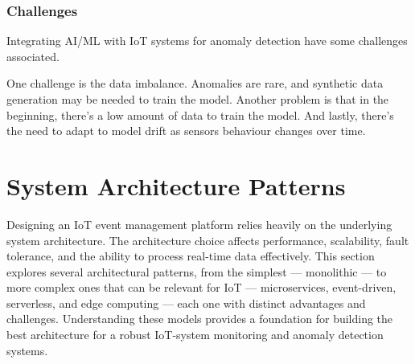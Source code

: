 \subsubsection{Challenges}

Integrating \gls{AI}/\gls{ML} with \gls{IoT} systems for anomaly detection
have some challenges associated.

One challenge is the data imbalance.
Anomalies are rare, and synthetic data generation may be needed to train
the model.
Another problem is that in the beginning, there's a low amount of data to
train the model.
And lastly, there's the need to adapt to model drift as sensors behaviour
changes over time.

\section{System Architecture Patterns}
Designing an IoT event management platform relies heavily on the underlying
system architecture. The architecture choice affects performance, scalability,
fault tolerance, and the ability to process real-time data effectively. This
section explores several architectural patterns, from the simplest --- monolithic
--- to more complex ones that can be relevant for IoT --- microservices,
event-driven, serverless, and edge computing --- each one with distinct
advantages and challenges. Understanding these models provides a foundation for
building the best architecture for a robust IoT-system monitoring and anomaly
detection systems.

